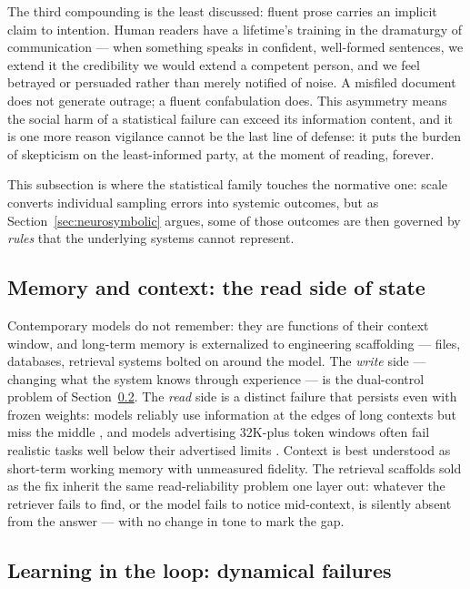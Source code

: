 \documentclass[11pt,a4paper]{article}
\begin{document}
The third compounding is the least discussed: fluent prose carries an
implicit claim to intention. Human readers have a lifetime's training in the
dramaturgy of communication \autocite{bender2021stochastic} --- when
something speaks in confident, well-formed sentences, we extend it the
credibility we would extend a competent person, and we feel betrayed or
persuaded rather than merely notified of noise. A misfiled document does not
generate outrage; a fluent confabulation does. This asymmetry means the
social harm of a statistical failure can exceed its information content,
and it is one more reason vigilance cannot be the last line of defense: it
puts the burden of skepticism on the least-informed party, at the moment of
reading, forever.

This subsection is where the statistical family touches the normative one:
scale converts individual sampling errors into systemic outcomes, but as
Section~\ref{sec:neurosymbolic} argues, some of those outcomes are then
governed by \emph{rules} that the underlying systems cannot represent.

\subsection{Memory and context: the read side of state}
\label{sec:memory}

Contemporary models do not remember: they are functions of their context
window, and long-term memory is externalized to engineering scaffolding ---
files, databases, retrieval systems bolted on around the model. The
\emph{write} side --- changing what the system knows through experience ---
is the dual-control problem of Section~\ref{sec:learning-in-the-loop}. The
\emph{read} side is a distinct failure that persists even with frozen
weights: models reliably use information at the edges of long contexts but
miss the middle \autocite{liu2024lost}, and models advertising 32K-plus token
windows often fail realistic tasks well below their advertised limits
\autocite{hsieh2024ruler}. Context is best understood as short-term working
memory with unmeasured fidelity. The retrieval scaffolds sold as the fix
inherit the same read-reliability problem one layer out: whatever the
retriever fails to find, or the model fails to notice mid-context, is
silently absent from the answer --- with no change in tone to mark the gap.

\subsection{Learning in the loop: dynamical failures}
\label{sec:learning-in-the-loop}
\end{document}
